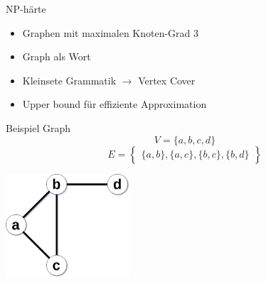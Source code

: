 \newcommand{\ExampleGraphV}{V = \{a,b,c,d\}}
\newcommand{\ExampleGraphE}{E = 
	\begin{Bmatrix}
		\{a,b\},
		\{a,c\},
		\{b,c\},
		\{b,d\}
	\end{Bmatrix}
}

\begin{frame}{\FrameName}
\begin{block}{NP-härte}
	\begin{itemize}[<+->]
			\item Graphen mit maximalen Knoten-Grad 3
			\item Graph als Wort 
			\item Kleinsete Grammatik $\rightarrow$ Vertex Cover
			\item Upper bound für effiziente Approximation \linebreak {}
		\end{itemize}
\end{block}
\end{frame}

\begin{frame}{\FrameName}
\begin{block}{Beispiel Graph}
	\Gap
	$$\ExampleGraphV$$ 
	$$\ExampleGraphE$$
	\begin{center}
		\includegraphics[width=0.35\textwidth]{Images/VertexCover/blank}
	\end{center}
\end{block}
\end{frame}

\newcommand{\ProdRuleOne}[1]{(\# #1 \Fresh #1\#  \Fresh )^2}
\newcommand{\ProdRuleTwo}[1]{\# #1 \#  \Fresh}
\newcommand{\ProdRuleThree}[2]{\# #1 \# #2\#  \Fresh}
\newcommand{\PhantomAlpha}{\phantom{\alpha_{Beispiel} = (}}
\newcommand{\ReductionExample}{
	$
		\alpha_{Beispiel} =
		\textcolor{OrangeRed}{
			\foreach \n in {a,b,c,d}{\ProdRuleOne{\n}}
		} \linebreak
		\PhantomAlpha
		\textcolor{PineGreen}{
			\foreach \n in {a,b,c,d}{\ProdRuleTwo{\n}}
		} \linebreak
		\PhantomAlpha
		\textcolor{RoyalBlue}{
			\ProdRuleThree{a}{b}
			\ProdRuleThree{a}{c}
			\ProdRuleThree{b}{c}
			\ProdRuleThree{b}{d}
		} \linebreak
	$
}

